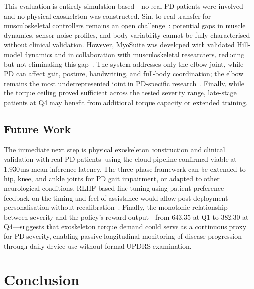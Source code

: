 \documentclass{article}
\begin{document}
This evaluation is entirely simulation-based---no real PD patients were
involved and no physical exoskeleton was constructed. Sim-to-real
transfer for musculoskeletal controllers remains an open
challenge~\citep{luo2025}; potential gaps in muscle dynamics, sensor
noise profiles, and body variability cannot be fully characterised without
clinical validation. However, MyoSuite was developed with validated
Hill-model dynamics and in collaboration with musculoskeletal researchers,
reducing but not eliminating this gap~\citep{caggiano2022}. The system
addresses only the elbow joint, while PD can affect gait, posture,
handwriting, and full-body coordination; the elbow remains the most
underrepresented joint in PD-specific research~\citep{capato2023}.
Finally, while the torque ceiling proved sufficient across the tested
severity range, late-stage patients at Q4 may benefit from additional
torque capacity or extended training.

\subsection{Future Work}

The immediate next step is physical exoskeleton construction and clinical
validation with real PD patients, using the cloud pipeline confirmed
viable at $1.930\,\mathrm{ms}$ mean inference latency. The three-phase
framework can be extended to hip, knee, and ankle joints for PD gait
impairment, or adapted to other neurological conditions. RLHF-based
fine-tuning using patient preference feedback on the timing and feel of
assistance would allow post-deployment personalisation without
recalibration~\citep{endrei2025}. Finally, the monotonic relationship
between severity and the policy's reward output---from $643.35$ at Q1 to
$382.30$ at Q4---suggests that exoskeleton torque demand could serve as a
continuous proxy for PD severity, enabling passive longitudinal monitoring
of disease progression through daily device use without formal UPDRS
examination.

\section{Conclusion}
\label{sec:conclusion}
\end{document}
